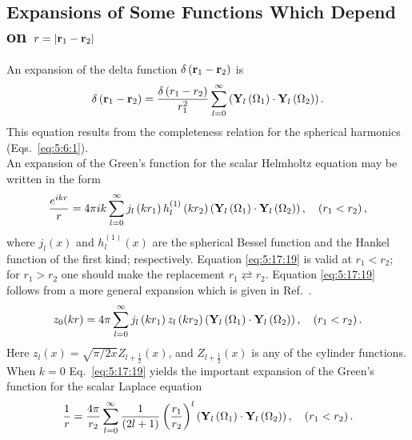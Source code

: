\subsection{Expansions of Some Functions Which Depend on $r=\left|\mathbf{r}_{1}-\mathbf{r}_{2}\right|$}\label{sec:5.17.4}
An expansion of the delta function $\delta\left(\mathbf{r}_{1}-\mathbf{r}_{2}\right)$ is
\begin{equation}
\delta\left(\mathbf{r}_{1}-\mathbf{r}_{2}\right)=\frac{\delta\left(r_{1}-r_{2}\right)}{r_{1}^{2}} \sum_{l=0}^{\infty}\left(\mathbf{Y}_{l}\left(\Omega_{1}\right) \cdot \mathbf{Y}_{l}\left(\Omega_{2}\right)\right). \label{eq:5:17:18}
\end{equation}
This equation results from the completeness relation for the spherical harmonics (Eqs.~\eqref{eq:5:6:1}).\\
An expansion of the Green's function for the scalar Helmholtz equation may be written in the form
\begin{equation}
\frac{e^{i k r}}{r}=4 \pi i k \sum_{l=0}^{\infty} j_{l}\left(k r_{1}\right) h_{l}^{(1)}\left(k r_{2}\right)\left(\mathbf{Y}_{l}\left(\Omega_{1}\right) \cdot \mathbf{Y}_{l}\left(\Omega_{2}\right)\right), \quad\left(r_{1}<r_{2}\right), \label{eq:5:17:19}
\end{equation}
where $j_l(x)$ and $h_{l}^{(1)}(x)$ are the spherical Bessel function and the Hankel function of the first kind; respectively. Equation \eqref{eq:5:17:19} is valid at $r_{1}<r_{2}$; for $r_{1}>r_{2}$ one should make the replacement $r_{1} \rightleftarrows r_{2}$. Equation \eqref{eq:5:17:19} follows from a more general expansion which is given in Ref.~\cite{ref070}.
\begin{equation}
z_{0}(k r)=4 \pi \sum_{l=0}^{\infty} j_{l}\left(k r_{1}\right) z_{l}\left(k r_{2}\right)\left(\mathbf{Y}_{l}\left(\Omega_{1}\right) \cdot \mathbf{Y}_{l}\left(\Omega_{2}\right)\right), \quad\left(r_{1}<r_{2}\right). \label{eq:5:17:20}
\end{equation}
Here $z_{l}(x)=\sqrt{\pi / 2 x} Z_{l+\frac{1}{2}}(x)$, and $Z_{l+\frac{1}{2}}(x)$ is any of the cylinder functions.\\
When $k=0$ Eq.~\eqref{eq:5:17:19} yields the important expansion of the Green's function for the scalar Laplace equation
\begin{equation}
\frac{1}{r}=\frac{4 \pi}{r_{2}} \sum_{l=0}^{\infty} \frac{1}{(2 l+1)}\left(\frac{r_{1}}{r_{2}}\right)^{l}\left(\mathbf{Y}_{l}\left(\Omega_{1}\right) \cdot \mathbf{Y}_{l}\left(\Omega_{2}\right)\right), \quad\left(r_{1}<r_{2}\right). \label{eq:5:17:21}
\end{equation}
